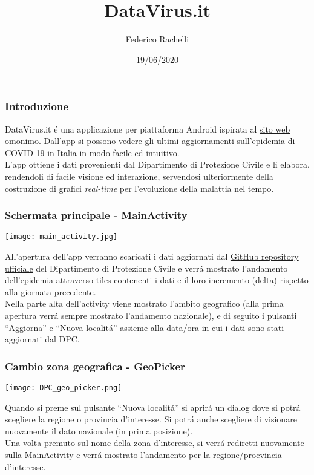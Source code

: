 \documentclass{beamer}
\title{DataVirus.it}
\author{Federico Rachelli}
\institute{Alma Mater Studiorum - Universitá di Bologna}
\date{19/06/2020}
\newcommand{\quotes}[1]{``#1''}
\begin{document}
    \frame{\titlepage}
    
    \begin{frame}
        \frametitle{Introduzione}
        DataVirus.it é una applicazione per piattaforma Android ispirata al \href{https://datavirus.it}{sito web omonimo}.
        Dall'app si possono vedere gli ultimi aggiornamenti sull'epidemia di COVID-19 in Italia in modo facile ed intuitivo.
        \\
        L'app ottiene i dati provenienti dal Dipartimento di Protezione Civile e li elabora, rendendoli di facile visione ed interazione, servendosi ulteriormente della costruzione di grafici \emph{real-time} per l'evoluzione della malattia nel tempo.
    \end{frame}

    \begin{frame}
        \frametitle{Schermata principale - MainActivity}
        \noindent\begin{minipage}{0.3\textwidth}%
            \texttt{[image: main\_activity.jpg]}
        \end{minipage}%
        \hfill%
        \begin{minipage}{0.6\textwidth}\raggedleft
            All'apertura dell'app verranno scaricati i dati aggiornati dal
            \href{https://github.com/pcm-dpc/COVID-19}{GitHub repository ufficiale} del Dipartimento di Protezione Civile
            e verrá mostrato l'andamento dell'epidemia attraverso tiles contenenti i dati e il loro incremento (delta) rispetto alla giornata precedente.
            \\
            Nella parte alta dell'activity viene mostrato l'ambito geografico (alla prima apertura verrá sempre mostrato l'andamento nazionale),
            e di seguito i pulsanti \quotes{Aggiorna} e \quotes{Nuova localitá} assieme alla data/ora in cui i dati sono stati aggiornati dal DPC.
            \\
            
        \end{minipage}
    \end{frame}

    \begin{frame}
        \frametitle{Cambio zona geografica - GeoPicker}
        \noindent\begin{minipage}{0.3\textwidth}%
            \texttt{[image: DPC\_geo\_picker.png]}
        \end{minipage}%
        \hfill%
        \begin{minipage}{0.6\textwidth}\raggedright
            Quando si preme sul pulsante \quotes{Nuova localitá} si aprirá un dialog dove si potrá scegliere la regione o provincia d'interesse.
            Si potrá anche scegliere di visionare nuovamente il dato nazionale (in prima posizione).
            \\
            Una volta premuto sul nome della zona d'interesse, si verrá rediretti nuovamente sulla MainActivity e verrá mostrato l'andamento per la regione/procvincia d'interesse.
        \end{minipage}
    \end{frame}
\end{document}
